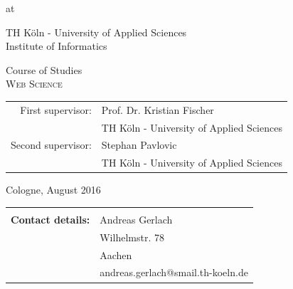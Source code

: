 \begin{titlepage}
\begin{center}
\vspace{0.6cm}

\begin{large}
at\\
\vspace{0.2cm}
\begin{scshape}
TH Köln - University of Applied Sciences\\
Institute of Informatics\\
\end{scshape}
\end{large}

\vspace{0.8cm}

\begin{large}
Course of Studies\\
\vspace{0.2cm}
\textsc{Web Science}
\end{large}


\vspace{1.0cm}

\begin{tabular}{rl}
        First supervisor:  &  Prof. Dr. Kristian Fischer\\
       					&  \small TH Köln - University of Applied Sciences \\[1.0em]
       Second supervisor:  &  Stephan Pavlovic \\
       					&  \small TH Köln - University of Applied Sciences\\
\end{tabular}

\vspace{0.6cm}

\begin{large}
Cologne, August 2016
\end{large}

\end{center}

\newpage
\thispagestyle{empty}

\begin{center}
\begin{tabular}{rl}
							&  \\[36.0em]

\large \textbf{Contact details:}	&  	\quad Andreas Gerlach\\
							&  	\quad Wilhelmstr. 78\\
							&	\quad 52070 Aachen\\
							&  	\quad andreas.gerlach@smail.th-koeln.de\\[2.0em]


\end{tabular}
\end{center}
\end{titlepage}
